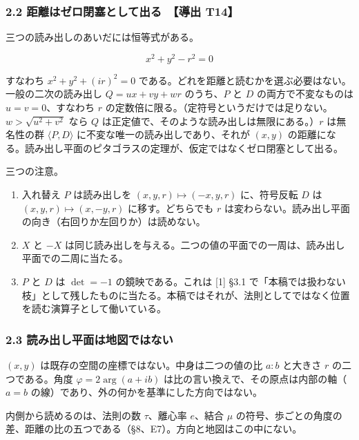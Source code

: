 \documentclass[
  a4paper,
]{ltjsarticle}
\begin{document}
\subsubsection{2.2 距離はゼロ閉塞として出る　【導出
T14】}\label{ux8dddux96e2ux306fux30bcux30edux9589ux585eux3068ux3057ux3066ux51faux308b-ux5c0eux51fa-t14}

三つの読み出しのあいだには恒等式がある。

\[
\boxed{\;x^2+y^2-r^2=0\;}
\]

すなわち \(x^2+y^2+(ir)^2=0\)
である。どれを距離と読むかを選ぶ必要はない。一般の二次の読み出し
\(Q=ux+vy+wr\) のうち、\(P\) と \(D\) の両方で不変なものは
\(u=v=0\)、すなわち \(r\)
の定数倍に限る。（定符号というだけでは足りない。\(w>\sqrt{u^2+v^2}\)
なら \(Q\) は正定値で、そのような読み出しは無限にある。）\(r\)
は無名性の群 \(\langle P,D\rangle\) に不変な唯一の読み出しであり、それが
\((x,y)\)
の距離になる。読み出し平面のピタゴラスの定理が、仮定ではなくゼロ閉塞として出る。

三つの注意。

\begin{enumerate}
\def\labelenumi{(\roman{enumi})}
\item
  入れ替え \(P\) は読み出しを \((x,y,r)\mapsto(-x,y,r)\) に、符号反転
  \(D\) は \((x,y,r)\mapsto(x,-y,r)\) に移す。どちらでも \(r\)
  は変わらない。読み出し平面の向き（右回りか左回りか）は読めない。
\item
  \(X\) と \(-X\)
  は同じ読み出しを与える。二つの値の平面での一周は、読み出し平面での二周に当たる。
\item
  \(P\) と \(D\) は \(\det=-1\) の鏡映である。これは {[}1{]} §3.1
  で「本稿では扱わない枝」として残したものに当たる。本稿ではそれが、法則としてではなく位置を読む演算子として働いている。
\end{enumerate}

\subsubsection{2.3
読み出し平面は地図ではない}\label{ux8aadux307fux51faux3057ux5e73ux9762ux306fux5730ux56f3ux3067ux306fux306aux3044}

\((x,y)\) は既存の空間の座標ではない。中身は二つの値の比 \(a:b\)
と大きさ \(r\) の二つである。角度 \(\varphi=2\arg(a+ib)\)
は比の言い換えで、その原点は内部の軸（\(a=b\)
の線）であり、外の何かを基準にした方向ではない。

内側から読めるのは、法則の数 \(\tau\)、離心率 \(e\)、結合 \(\mu\)
の符号、歩ごとの角度の差、距離の比の五つである（§8、E7）。方向と地図はこの中にない。
\end{document}
